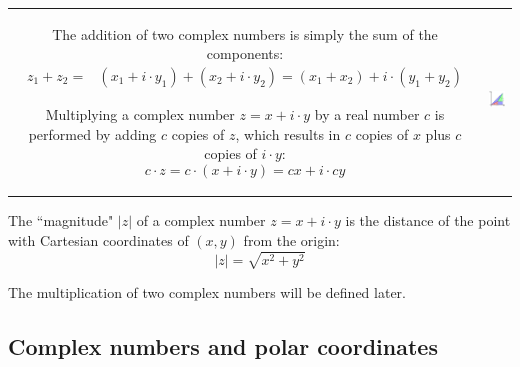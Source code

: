 \documentclass{article}
\begin{document}
\vspace{5mm}

\begin{center}
\begin{tabular}{cc}
\parbox{0.5\textwidth}{
The addition of two complex numbers is simply the sum of the components: 
\begin{align*} 
z_1 + z_2 
= & (x_1 + i \cdot y_1) + (x_2 + i \cdot y_2)  
= (x_1 + x_2) + i \cdot (y_1 + y_2)
\end{align*} 

Multiplying a complex number \(z = x + i \cdot y\) by a real number \(c\) is performed by adding \(c\) copies of \(z\), which results in \(c\) copies of \(x\) plus \(c\) copies of \(i \cdot y\):
\[c \cdot z = c \cdot (x + i \cdot y) = cx + i \cdot cy\]
} & \parbox{0.5\textwidth}{
\includegraphics[scale = 0.7]{complex_number_addition}
}
\end{tabular}
\end{center}

The ``magnitude" \(|z|\) of a complex number \(z = x + i \cdot y\) is the distance of the point with Cartesian coordinates of \((x,y)\) from the origin: 
\[|z| = \sqrt{x^2 + y^2}\]

The multiplication of two complex numbers will be defined later.


\subsection*{Complex numbers and polar coordinates}
\end{document}
